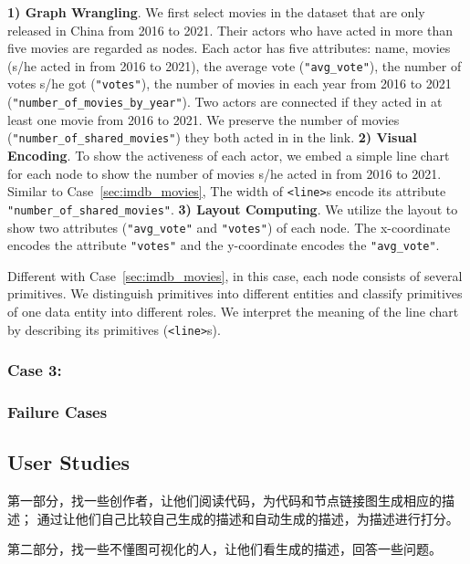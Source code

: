\textbf{1) Graph Wrangling}. We first select movies in the dataset that are only released in China from 2016 to 2021.
Their actors who have acted in more than five movies are regarded as nodes.
Each actor has five attributes: name, movies (s/he acted in from 2016 to 2021), the average vote (\texttt{"avg\_vote"}), the number of votes s/he got (\texttt{"votes"}), the number of movies in each year from 2016 to 2021 (\texttt{"number\_of\_movies\_by\_year"}).
Two actors are connected if they acted in at least one movie from 2016 to 2021.
We preserve the number of movies (\texttt{"number\_of\_shared\_movies"}) they both acted in in the link.
\textbf{2) Visual Encoding}. To show the activeness of each actor, we embed a simple line chart for each node to show the number of movies s/he acted in from 2016 to 2021. Similar to Case~\ref{sec:imdb_movies}, The width of \texttt{<line>}s encode its attribute \texttt{"number\_of\_shared\_movies"}.
\textbf{3) Layout Computing}. We utilize the layout to show two attributes (\texttt{"avg\_vote"} and \texttt{"votes"}) of each node. The x-coordinate encodes the attribute \texttt{"votes"} and the y-coordinate encodes the \texttt{"avg\_vote"}.

Different with Case~\ref{sec:imdb_movies}, in this case, each node consists of several primitives.
We distinguish primitives into different entities and classify primitives of one data entity into different roles.
We interpret the meaning of the line chart by describing its primitives (\texttt{<line>}s).

\subsubsection{Case 3: }

\subsubsection{Failure Cases}

\subsection{User Studies}
第一部分，找一些创作者，让他们阅读代码，为代码和节点链接图生成相应的描述；
通过让他们自己比较自己生成的描述和自动生成的描述，为描述进行打分。

第二部分，找一些不懂图可视化的人，让他们看生成的描述，回答一些问题。